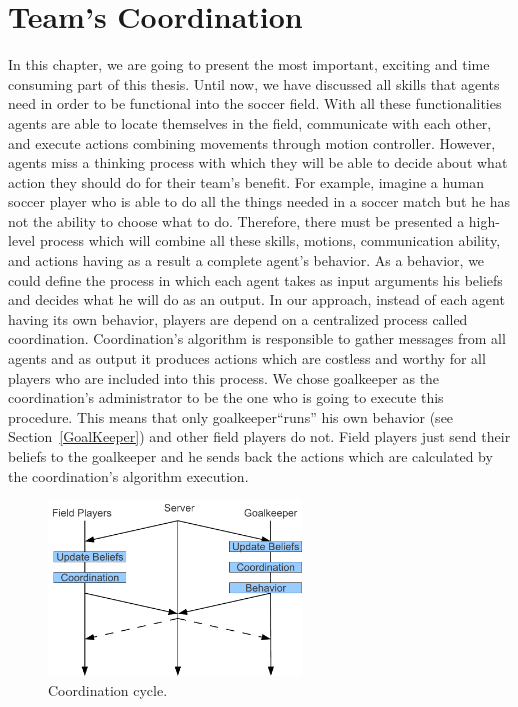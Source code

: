 \chapter{Team's Coordination}
\label{Coordination}

In this chapter, we are going to present the most important, exciting and time consuming part of this thesis. Until now, we have discussed all skills that agents need in order to be functional into the soccer field. With all these functionalities agents are able to locate themselves in the field, communicate with each other, and execute actions combining movements through motion controller. However, agents miss a thinking process with which they will be able to decide about what action they should do for their team's benefit. For example, imagine a human soccer player who is able to do all the things needed in a soccer match but he has not the ability to choose what to do. Therefore, there must be presented a high-level process which will combine all these skills, motions, communication ability, and actions having as a result a complete agent's behavior. As a behavior, we could define the process in which each agent takes as input arguments his beliefs and decides what he will do as an output. In our approach, instead of each agent having its own behavior, players are depend on a centralized process called coordination.  Coordination's algorithm is responsible to gather messages from all agents and as output it produces actions which are costless and worthy for all players who are included into this process. We chose goalkeeper as the coordination's administrator to be the one who is going to execute this procedure. This means that only goalkeeper``runs'' his own behavior (see Section~\ref{GoalKeeper}) and other field players do not. Field players just send their beliefs to the goalkeeper and he sends back the actions which are calculated by the coordination's algorithm execution.


\begin{figure}[t!]
\centering
  \includegraphics[width=0.6\textwidth]{Chapter4/figures/CoordinationCycle.pdf}
  \caption{Coordination cycle.} 
  \label{fig:CoordinationCycle}
\end{figure}


